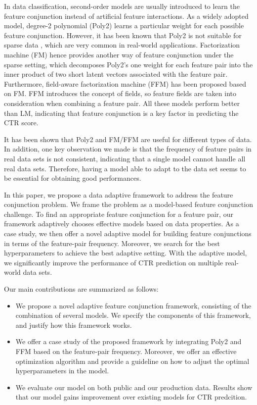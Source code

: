 In data classification, second-order models are usually introduced to learn the feature conjunction instead of artificial feature interactions. As a widely adopted model, degree-2 polynomial (Poly2) \cite{Chang:2010:TTL:1756006.1859899} learns a particular weight for each possible feature conjunction. However, it has been known that Poly2 is not suitable for sparse data \cite{Juan:2016:FFM:2959100.2959134}, which are very common in real-world applications. Factorization machine (FM) \cite{5694074}\cite{Rendle:2012:FML:2168752.2168771} hence provides another way of feature conjunction under the sparse setting, which decomposes Poly2's one weight for each feature pair into the inner product of two short latent vectors associated with the feature pair. Furthermore, field-aware factorization machine (FFM) \cite{Juan:2016:FFM:2959100.2959134} has been proposed based on FM. FFM introduces the concept of fields, so feature fields are taken into consideration when combining a feature pair. All these models perform better than LM, indicating that feature conjunction is a key factor in predicting the CTR score.

It has been shown \cite{Juan:2016:FFM:2959100.2959134} that Poly2 and FM/FFM are useful for different types of data. In addition, one key observation we made is that the frequency of feature pairs in real data sets is not consistent, indicating that a single model cannot handle all real data sets. Therefore, having a model able to adapt to the data set seems to be essential for obtaining good performances.

In this paper, we propose a data adaptive framework to address the feature conjunction problem. We frame the problem as a model-based feature conjunction challenge. To find an appropriate feature conjunction for a feature pair, our framework adaptively chooses effective models based on data properties. As a case study, we then offer a novel adaptive model for building feature conjunctions in terms of the feature-pair frequency. Moreover, we search for the best hyperparameters to achieve the best adaptive setting. With the adaptive model, we significantly improve the performance of CTR prediction on multiple real-world data sets.

Our main contributions are summarized as follows:
\begin{itemize}
\item We propose a novel adaptive feature conjunction framework, consisting of the combination of several models. We specify the components of this framework, and justify how this framework works.
\item We offer a case study of the proposed framework by integrating Poly2 and FFM based on the feature-pair frequency. Moreover, we offer an effective optimization algorithm and provide a guideline on how to adjust the optimal hyperparameters in the model.
\item We evaluate our model on both public and our production data. Results show that our model gains improvement over existing models for CTR predcition.
\end{itemize}
